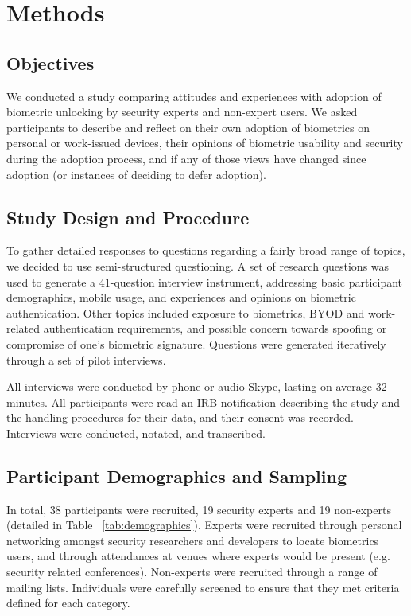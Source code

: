 \section{Methods}
\subsection{Objectives}
We conducted a study comparing attitudes and experiences with adoption of
biometric unlocking by security experts and non-expert users. We asked
participants to describe and reflect on their own adoption of biometrics on
personal or work-issued devices, their opinions of biometric usability and
security during the adoption process, and if any of those views have changed
since adoption (or instances of deciding to defer adoption).

\subsection{Study Design and Procedure}
To gather detailed responses to questions regarding a fairly broad range of
topics, we decided to use semi-structured questioning. A set of research
questions was used to generate a 41-question interview instrument, addressing
basic participant demographics, mobile usage, and experiences and opinions on
biometric authentication. Other topics included exposure to biometrics, BYOD and
work-related authentication requirements, and possible concern towards spoofing
or compromise of one's biometric signature. Questions were generated iteratively
through a set of pilot interviews.

All interviews were conducted by phone or audio Skype, lasting on average 32
minutes. All participants were read an IRB notification describing the study and
the handling procedures for their data, and their consent was recorded.
Interviews were conducted, notated, and transcribed.

\subsection{Participant Demographics and Sampling}
In total, 38 participants were recruited, 19 security experts and 19 non-experts
(detailed in Table ~\ref{tab:demographics}). Experts were recruited through
personal networking amongst security researchers and developers to locate
biometrics users, and through attendances at venues where experts would be
present (e.g. security related conferences). Non-experts were recruited through
a range of mailing lists. Individuals were carefully screened to ensure that
they met criteria defined for each category.

